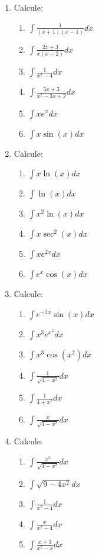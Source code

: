 \documentclass[oneside,a4paper,12pt]{article}
\begin{document}
\begin{enumerate}
	\item Calcule:
	\begin{multicols}{2}
		\begin{enumerate}
			\item $\displaystyle \int \frac{1}{(x+1)(x-1)}dx$
			\item $\displaystyle \int \frac{2x+3}{x(x-2)}dx$
			\item $\displaystyle \int \frac{1}{x^2 -4}dx$
			\item $\displaystyle \int \frac{5x + 3}{x^2 -3x +2}dx$
			\item $\displaystyle \int xe^x dx$
			\item $\displaystyle \int x\sin(x)dx$
		\end{enumerate}
	\end{multicols}
	
	\item Calcule:
	\begin{multicols}{2}
		\begin{enumerate}
			\item $\displaystyle \int x\ln(x)dx$
			\item $\displaystyle \int \ln(x)dx$
			\item $\displaystyle \int x^2 \ln(x)dx$
			\item $\displaystyle \int x\sec^2(x)dx$
			\item $\displaystyle \int xe^{2x}dx$
			\item $\displaystyle \int e^x\cos(x)dx$ 
		\end{enumerate}
	\end{multicols}
	
	\item Calcule:
	\begin{multicols}{2}
		\begin{enumerate}
			\item $\displaystyle \int e^{-2x}\sin(x)dx$
			\item $\displaystyle \int x^3e^{x^2}dx$
			\item $\displaystyle \int x^3\cos(x^2)dx$
			\item $\displaystyle \int \frac{1}{\sqrt{4-x^2}}dx$
			\item $\displaystyle \int \frac{1}{4+x^2}dx$
			\item $\displaystyle \int \frac{x}{\sqrt{1-x^2}}dx$
		\end{enumerate}
	\end{multicols}

	\item Calcule:
	\begin{multicols}{2}
		\begin{enumerate}
			\item $\displaystyle \int \frac{x^2}{\sqrt{1-x^2}}dx$
			\item $\displaystyle \int \sqrt{9-4x^2}dx$
			\item $\displaystyle \int \frac{1}{x^2 - 4}dx$
			\item $\displaystyle \int \frac{x}{x^2 -4}dx$
			\item $\displaystyle \int \frac{x+3}{x^2 - x}dx$
		\end{enumerate}
	\end{multicols}
	

\end{enumerate}
\end{document}
